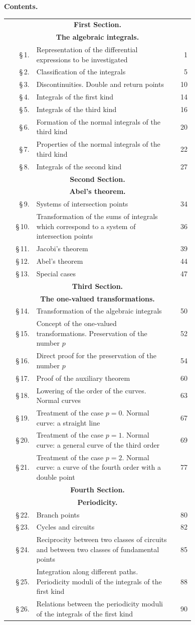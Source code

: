 \documentclass[10pt]{article}
\newcommand{\tocentry}[3]{\S\,#1 & #2 & #3\\}
\newcommand{\tocsec}[2]{\multicolumn{3}{c}{\bfseries #1}\\[-0.15em]\multicolumn{3}{c}{\bfseries #2}\\[0.25em]}
\begin{document}
\clearpage



\begin{center}
{\Large\bfseries Contents.}
\end{center}

{\scriptsize
\begin{longtable}{@{}r@{\ }p{0.74\linewidth}@{\ }r@{}}
\tocsec{First Section.}{The algebraic integrals.}
\tocentry{1.}{Representation of the differential expressions to be investigated}{1}
\tocentry{2.}{Classification of the integrals}{5}
\tocentry{3.}{Discontinuities. Double and return points}{10}
\tocentry{4.}{Integrals of the first kind}{14}
\tocentry{5.}{Integrals of the third kind}{16}
\tocentry{6.}{Formation of the normal integrals of the third kind}{20}
\tocentry{7.}{Properties of the normal integrals of the third kind}{22}
\tocentry{8.}{Integrals of the second kind}{27}
\tocsec{Second Section.}{Abel's theorem.}
\tocentry{9.}{Systems of intersection points}{34}
\tocentry{10.}{Transformation of the sums of integrals which correspond to a system of intersection points}{36}
\tocentry{11.}{Jacobi's theorem}{39}
\tocentry{12.}{Abel's theorem}{44}
\tocentry{13.}{Special cases}{47}
\tocsec{Third Section.}{The one-valued transformations.}
\tocentry{14.}{Transformation of the algebraic integrals}{50}
\tocentry{15.}{Concept of the one-valued transformations. Preservation of the number $p$}{52}
\tocentry{16.}{Direct proof for the preservation of the number $p$}{54}
\tocentry{17.}{Proof of the auxiliary theorem}{60}
\tocentry{18.}{Lowering of the order of the curves. Normal curves}{63}
\tocentry{19.}{Treatment of the case $p=0$. Normal curve: a straight line}{67}
\tocentry{20.}{Treatment of the case $p=1$. Normal curve: a general curve of the third order}{69}
\tocentry{21.}{Treatment of the case $p=2$. Normal curve: a curve of the fourth order with a double point}{77}
\tocsec{Fourth Section.}{Periodicity.}
\tocentry{22.}{Branch points}{80}
\tocentry{23.}{Cycles and circuits}{82}
\tocentry{24.}{Reciprocity between two classes of circuits and between two classes of fundamental points}{85}
\tocentry{25.}{Integration along different paths. Periodicity moduli of the integrals of the first kind}{88}
\tocentry{26.}{Relations between the periodicity moduli of the integrals of the first kind}{90}

\end{longtable}}
\end{document}
